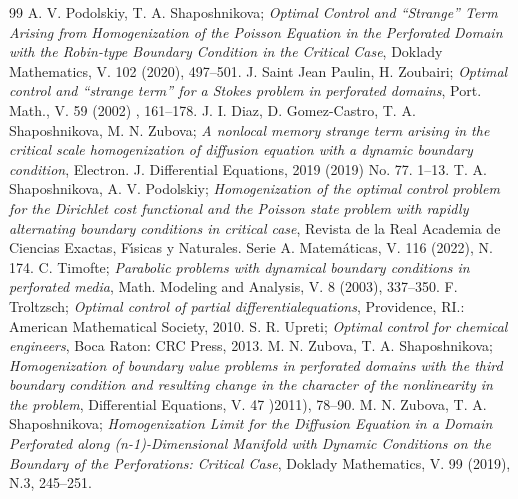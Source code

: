 \documentclass[10pt,a4paper]{amsart}
\numberwithin{equation}{section}
\begin{document}
\begin{thebibliography}{99}
  A. V. Podolskiy, T. A. Shaposhnikova;
\emph{Optimal Control and ``Strange'' Term Arising from Homogenization of the Poisson 
Equation in the Perforated Domain with the Robin-type Boundary Condition in the Critical
Case}, Doklady Mathematics, V. 102 (2020), 497--501.
  J. Saint Jean Paulin, H. Zoubairi;
\emph{Optimal control and ``strange term''  for a Stokes problem in
perforated domains}, Port. Math., V. 59 (2002) , 161--178.
  J. I. Diaz, D. Gomez-Castro, T. A. Shaposhnikova, M. N. Zubova;
\emph{A nonlocal memory strange term arising in the critical scale
homogenization of diffusion equation with a dynamic boundary condition},
Electron. J. Differential Equations, 2019 (2019) No. 77. 1--13.
T. A. Shaposhnikova, A. V. Podolskiy;
\emph{Homogenization of the optimal control problem for the Dirichlet
cost functional and the Poisson state problem with rapidly alternating
boundary conditions in critical case}, Revista de la Real Academia de
Ciencias Exactas, F\'{\i}sicas y Naturales. Serie A. Matem\'{a}ticas, V.
116 (2022), N. 174.
  C. Timofte;
\emph{Parabolic problems with dynamical boundary
conditions in perforated media}, 
Math. Modeling and Analysis, V. 8 (2003), 337--350.
  F. Troltzsch;
\emph{Optimal control of partial differentialequations}, 
Providence, RI.: American Mathematical Society, 2010.
  S. R. Upreti;
\emph{Optimal control for chemical engineers},
Boca Raton: CRC Press, 2013.
  M. N. Zubova, T. A. Shaposhnikova;
\emph{Homogenization of boundary value problems in perforated domains with 
the third boundary condition and resulting change in the character of the 
nonlinearity in the problem}, Differential Equations, V. 47 )2011), 78--90.
  M. N. Zubova, T. A. Shaposhnikova;
\emph{Homogenization Limit for the Diffusion Equation in a Domain Perforated along
(n-1)-Dimensional Manifold with Dynamic Conditions on the Boundary of the
Perforations: Critical Case}, Doklady Mathematics, V. 99 (2019), N.3, 245--251.
\end{thebibliography}
\end{document}
